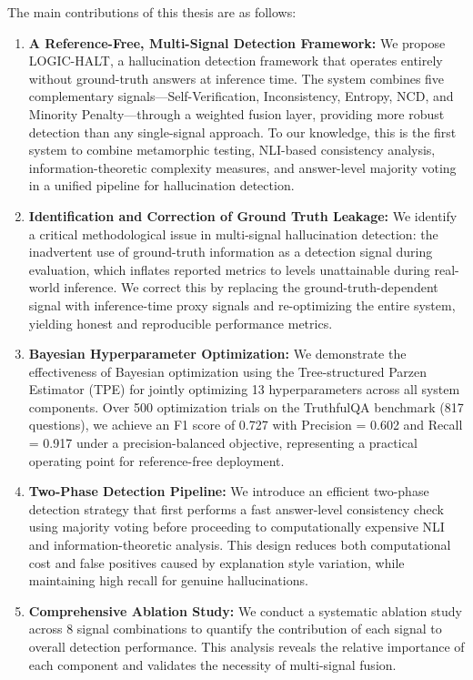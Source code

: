 The main contributions of this thesis are as follows:

\begin{enumerate}
    \item \textbf{A Reference-Free, Multi-Signal Detection Framework:} We propose LOGIC-HALT, a hallucination detection framework that operates entirely without ground-truth answers at inference time. The system combines five complementary signals---Self-Verification, Inconsistency, Entropy, NCD, and Minority Penalty---through a weighted fusion layer, providing more robust detection than any single-signal approach. To our knowledge, this is the first system to combine metamorphic testing, NLI-based consistency analysis, information-theoretic complexity measures, and answer-level majority voting in a unified pipeline for hallucination detection.

    \item \textbf{Identification and Correction of Ground Truth Leakage:} We identify a critical methodological issue in multi-signal hallucination detection: the inadvertent use of ground-truth information as a detection signal during evaluation, which inflates reported metrics to levels unattainable during real-world inference. We correct this by replacing the ground-truth-dependent signal with inference-time proxy signals and re-optimizing the entire system, yielding honest and reproducible performance metrics.

    \item \textbf{Bayesian Hyperparameter Optimization:} We demonstrate the effectiveness of Bayesian optimization using the Tree-structured Parzen Estimator (TPE) for jointly optimizing 13 hyperparameters across all system components. Over 500 optimization trials on the TruthfulQA benchmark (817 questions), we achieve an F1 score of 0.727 with Precision = 0.602 and Recall = 0.917 under a precision-balanced objective, representing a practical operating point for reference-free deployment.

    \item \textbf{Two-Phase Detection Pipeline:} We introduce an efficient two-phase detection strategy that first performs a fast answer-level consistency check using majority voting before proceeding to computationally expensive NLI and information-theoretic analysis. This design reduces both computational cost and false positives caused by explanation style variation, while maintaining high recall for genuine hallucinations.

    \item \textbf{Comprehensive Ablation Study:} We conduct a systematic ablation study across 8 signal combinations to quantify the contribution of each signal to overall detection performance. This analysis reveals the relative importance of each component and validates the necessity of multi-signal fusion.


\end{enumerate}
